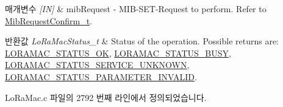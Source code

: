 \begin{DoxyParams}{매개변수}
{\em \mbox{[}\+I\+N\mbox{]}} & mib\+Request -\/ M\+I\+B-\/\+S\+E\+T-\/\+Request to perform. Refer to \mbox{\hyperlink{group___l_o_r_a_m_a_c_ga9269d5ae88dd157a58e9d60f680d63f0}{Mib\+Request\+Confirm\+\_\+t}}.\\
\hline
\end{DoxyParams}

\begin{DoxyRetVals}{반환값}
{\em Lo\+Ra\+Mac\+Status\+\_\+t} & Status of the operation. Possible returns are\+: \mbox{\hyperlink{group___l_o_r_a_m_a_c_gga1d18f26b344040b3ec5c3db662919661a03db5fca052313edb3823c014b653a74}{L\+O\+R\+A\+M\+A\+C\+\_\+\+S\+T\+A\+T\+U\+S\+\_\+\+OK}}, \mbox{\hyperlink{group___l_o_r_a_m_a_c_gga1d18f26b344040b3ec5c3db662919661a66b12f569207eacd97ee1c1d6c4cee6d}{L\+O\+R\+A\+M\+A\+C\+\_\+\+S\+T\+A\+T\+U\+S\+\_\+\+B\+U\+SY}}, \mbox{\hyperlink{group___l_o_r_a_m_a_c_gga1d18f26b344040b3ec5c3db662919661aff502a87db22d6a9a4919e4b54c7c1cf}{L\+O\+R\+A\+M\+A\+C\+\_\+\+S\+T\+A\+T\+U\+S\+\_\+\+S\+E\+R\+V\+I\+C\+E\+\_\+\+U\+N\+K\+N\+O\+WN}}, \mbox{\hyperlink{group___l_o_r_a_m_a_c_gga1d18f26b344040b3ec5c3db662919661ad0d3119f247d00e1787dda106fcb3017}{L\+O\+R\+A\+M\+A\+C\+\_\+\+S\+T\+A\+T\+U\+S\+\_\+\+P\+A\+R\+A\+M\+E\+T\+E\+R\+\_\+\+I\+N\+V\+A\+L\+ID}}. \\
\hline
\end{DoxyRetVals}


Lo\+Ra\+Mac.\+c 파일의 2792 번째 라인에서 정의되었습니다.


